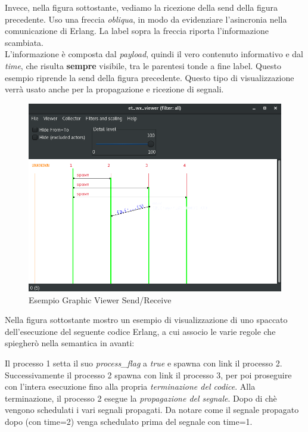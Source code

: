 \documentclass[Contributo.tex]{subfiles}
\begin{document}
	Invece, nella figura sottostante, vediamo la ricezione della send della figura precedente. Uso una freccia \textit{obliqua}, in modo da evidenziare l'asincronia nella comunicazione di Erlang.
	La label sopra la freccia riporta l'informazione scambiata.\\
	L'informazione è composta dal \textit{payload}, quindi il vero contenuto informativo e dal \textit{time}, che risulta \textbf{sempre} visibile, tra le parentesi tonde a fine label. Questo esempio riprende la send della figura precedente. Questo tipo di visualizzazione verrà usato anche per la propagazione e ricezione di segnali.
	\begin{figure}[H]
		\includegraphics[scale=0.5]{./LavoroLuca/EstensioneCauder/Imgs/GraphicViewerSendReceive}
		\caption{Esempio Graphic Viewer Send/Receive}
		\label{fig6}
	\end{figure}
	Nella figura sottostante mostro un esempio di visualizzazione di uno spaccato dell'esecuzione del seguente codice Erlang, a cui associo le varie regole che spiegherò nella semantica in avanti:
		
	Il processo 1 setta il suo \textit{process\_flag} a \textit{true} e spawna con link il processo 2. Successivamente il processo 2 spawna con link il processo 3, per poi proseguire con l'intera esecuzione fino alla propria \textit{terminazione del codice}. Alla terminazione, il processo 2 esegue la \textit{propagazione del segnale}. Dopo di chè vengono schedulati i vari segnali propagati. Da notare come il segnale propagato dopo (con time=2) venga schedulato prima del segnale con time=1.
\end{document}
